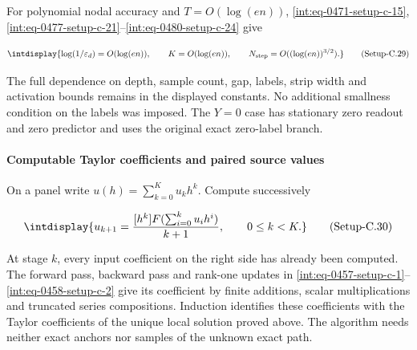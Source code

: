 For polynomial nodal accuracy and \(T=O(\log(en))\), \hyperref[int:eq-setup-c-15]{\eqref{int:eq-0471-setup-c-15}}, \hyperref[int:eq-setup-c-21]{\eqref{int:eq-0477-setup-c-21}}--\allowbreak \hyperref[int:eq-setup-c-24]{\eqref{int:eq-0480-setup-c-24}} give


\label{int:eq-setup-c-29}
\begingroup\renewcommand{\theHequation}{intdisplay.958}
\begin{equation}
\intdisplay{
\log(1/\varepsilon_d)=O(\log(en)),\qquad
K=O(\log(en)),\qquad
N_{\rm step}=O((\log(en))^{3/2}).
}
\tag{Setup-C.29}
\label{int:eq-0485-setup-c-29}
\end{equation}
\endgroup


The full dependence on depth, sample count, gap, labels, strip width and activation bounds remains in the displayed constants. No additional smallness condition on the labels was imposed. The \(Y=0\) case has stationary zero readout and zero predictor and uses the original exact zero-label branch.


\paragraph{Computable Taylor coefficients and paired source values}
\label{int:setup-core-6}
\mbox{}\par\smallskip


On a panel write \(u(h)=\sum_{k=0}^K u_kh^k\). Compute successively


\label{int:eq-setup-c-30}
\begingroup\renewcommand{\theHequation}{intdisplay.959}
\begin{equation}
\intdisplay{
u_{k+1}=\frac{[h^k]F(\sum_{i=0}^ku_ih^i)}{k+1},
\qquad 0\le k<K.
}
\tag{Setup-C.30}
\label{int:eq-0486-setup-c-30}
\end{equation}
\endgroup


At stage \(k\), every input coefficient on the right side has already been computed. The forward pass, backward pass and rank-one updates in \hyperref[int:eq-setup-c-1]{\eqref{int:eq-0457-setup-c-1}}--\allowbreak \hyperref[int:eq-setup-c-2]{\eqref{int:eq-0458-setup-c-2}} give its coefficient by finite additions, scalar multiplications and truncated series compositions. Induction identifies these coefficients with the Taylor coefficients of the unique local solution proved above. The algorithm needs neither exact anchors nor samples of the unknown exact path.



